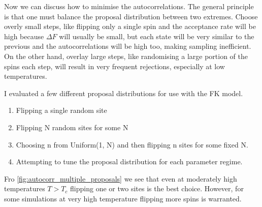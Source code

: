 Now we can discuss how to minimise the autocorrelations. The general principle is that one must balance the proposal distribution between two extremes. Choose overly small steps, like flipping only a single spin and the acceptance rate will be high because \(\Delta F\) will usually be small, but each state will be very similar to the previous and the autocorrelations will be high too, making sampling inefficient. On the other hand, overlay large steps, like randomising a large portion of the spins each step, will result in very frequent rejections, especially at low temperatures.

I evaluated a few different proposal distributions for use with the FK model.

\begin{enumerate}
\def\labelenumi{\arabic{enumi}.}
\tightlist
\item
  Flipping a single random site
\item
  Flipping N random sites for some N
\item
  Choosing n from Uniform(1, N) and then flipping n sites for some fixed N.
\item
  Attempting to tune the proposal distribution for each parameter regime.
\end{enumerate}

Fro \cref{fig:autocorr_multiple_proposals} we see that even at moderately high temperatures \(T > T_c\) flipping one or two sites is the best choice. However, for some simulations at very high temperature flipping more spins is warranted.
